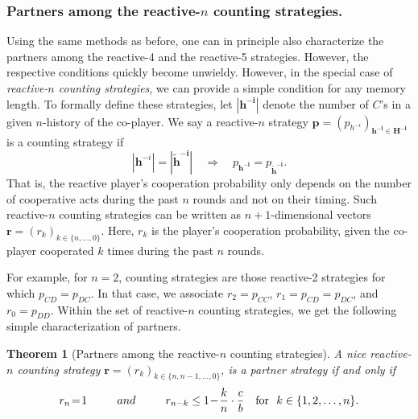 \documentclass[9pt,twoside,lineno]{pnas-new}
\theoremstyle{plainCl1}
\newtheorem{theorem}{Theorem}
\theoremstyle{plainCl2}
\begin{document}

\noindent
\subsubsection*{Partners among the reactive-$n$ counting strategies.}
Using the same methods as before, one can in principle also characterize the partners among the reactive-4 and the reactive-5 strategies. However, the  respective conditions quickly become unwieldy. 
However, in the special case of  {\it reactive-$n$ counting strategies}, we can provide a simple condition for any memory length.
To formally define these strategies, let $|\mathbf{h^{-i}}|$ denote the number of $C$'s in a given $n$-history of the co-player. 
We say a reactive-$n$ strategy $\mathbf{p}\!=\!(p_{h^{-i}})_{\mathbf{h^{-i}\in H^{-i}}}$ is a counting strategy if 
\begin{equation}
|\mathbf{h}^{-i}|\! =\! |\mathbf{\tilde h^{-i}}| \quad \Rightarrow \quad p_\mathbf{h^{-i}} = p_\mathbf{\tilde h^{-i}}. 
\end{equation} 
That is, the reactive player's cooperation probability only depends on the number of cooperative acts during the past $n$ rounds and not on their timing. 
Such reactive-$n$ counting strategies can be written as $n\!+\!1$-dimensional vectors $\mathbf{r}\!=\!(r_k)_{k\in\{n,\ldots,0\}}$.
Here, $r_k$ is the player's cooperation probability, given the co-player cooperated $k$ times during the past $n$ rounds. 

For example, for $n\!=\!2$, counting strategies are those reactive-2 strategies for which $p_{CD}\!=\!p_{DC}$. 
In that case, we associate $r_2\!=\!p_{CC}$, $r_1\!=\!p_{CD}\!=\!p_{DC}$, and $r_0\!=\!p_{DD}$. 
Within the set of reactive-$n$ counting strategies, we get the following simple characterization of partners. 

\begin{theorem}[Partners among the reactive-$n$ counting strategies]\label{theorem:reactive_counting_partner_strategies}
A nice reactive-$n$ counting strategy $\mathbf{r}\!=\!(r_k)_{k \in \{n, n-1, \dots, 0\}}$,
is a partner strategy if and only if
\begin{equation} \label{Eq:PartnerCounting}
  r_n \!=\! 1 \qquad ~~and~~ \qquad r_{n - k} \le 1 \!-\! \frac{k}{n} \cdot \frac{c}{b} ~~~\text{\normalfont for }~ k \in \{1, 2, \dots, n\}.
\end{equation}
\end{theorem}
\end{document}
